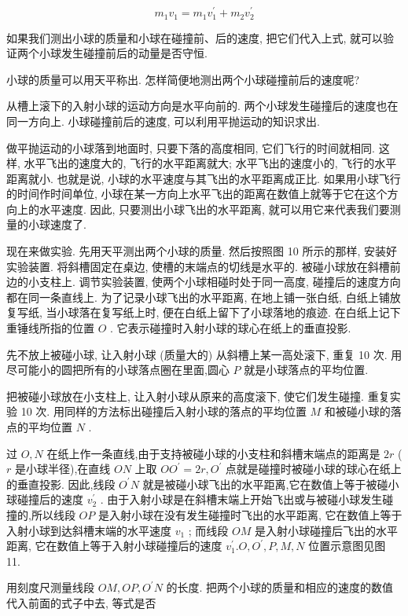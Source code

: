 \documentclass[10pt]{article}
\begin{document}
\[
{m}_{1}{v}_{1} = {m}_{1}{v}_{1}^{\prime } + {m}_{2}{v}_{2}^{\prime }
\]

如果我们测出小球的质量和小球在碰撞前、后的速度, 把它们代入上式, 就可以验证两个小球发生碰撞前后的动量是否守恒.

小球的质量可以用天平称出. 怎样简便地测出两个小球碰撞前后的速度呢?

从槽上滚下的入射小球的运动方向是水平向前的. 两个小球发生碰撞后的速度也在同一方向上. 小球碰撞前后的速度, 可以利用平抛运动的知识求出.

做平抛运动的小球落到地面时, 只要下落的高度相同, 它们飞行的时间就相同. 这样, 水平飞出的速度大的, 飞行的水平距离就大; 水平飞出的速度小的, 飞行的水平距离就小. 也就是说, 小球的水平速度与其飞出的水平距离成正比. 如果用小球飞行的时间作时间单位, 小球在某一方向上水平飞出的距离在数值上就等于它在这个方向上的水平速度. 因此, 只要测出小球飞出的水平距离, 就可以用它来代表我们要测量的小球速度了.

现在来做实验. 先用天平测出两个小球的质量. 然后按照图 10 所示的那样, 安装好实验装置. 将斜槽固定在桌边, 使槽的末端点的切线是水平的. 被碰小球放在斜槽前边的小支柱上. 调节实验装置, 使两个小球相碰时处于同一高度, 碰撞后的速度方向都在同一条直线上. 为了记录小球飞出的水平距离, 在地上铺一张白纸, 白纸上铺放复写纸, 当小球落在复写纸上时, 便在白纸上留下了小球落地的痕迹. 在白纸上记下重锤线所指的位置 \(O\) . 它表示碰撞时入射小球的球心在纸上的垂直投影.

先不放上被碰小球, 让入射小球 (质量大的) 从斜槽上某一高处滚下, 重复 10 次. 用尽可能小的圆把所有的小球落点圈在里面,圆心 \(P\) 就是小球落点的平均位置.

把被碰小球放在小支柱上, 让入射小球从原来的高度滚下, 使它们发生碰撞. 重复实验 10 次. 用同样的方法标出碰撞后入射小球的落点的平均位置 \(M\) 和被碰小球的落点的平均位置 \(N\) .

过 \(O,N\) 在纸上作一条直线,由于支持被碰小球的小支柱和斜槽末端点的距离是 \({2r}\) ( \(r\) 是小球半径),在直线 \({ON}\) 上取 \(O{O}^{\prime } = {2r},{O}^{\prime }\) 点就是碰撞时被碰小球的球心在纸上的垂直投影. 因此,线段 \({O}^{\prime }N\) 就是被碰小球飞出的水平距离,它在数值上等于被碰小球碰撞后的速度 \({v}_{2}^{\prime }\) . 由于入射小球是在斜槽末端上开始飞出或与被碰小球发生碰撞的,所以线段 \({OP}\) 是入射小球在没有发生碰撞时飞出的水平距离, 它在数值上等于入射小球到达斜槽末端的水平速度 \({v}_{1}\) ; 而线段 \({OM}\) 是入射小球碰撞后飞出的水平距离, 它在数值上等于入射小球碰撞后的速度 \({v}_{1}^{\prime }.O,{O}^{\prime },P,M,N\) 位置示意图见图 11.

用刻度尺测量线段 \({OM},{OP},{O}^{\prime }N\) 的长度. 把两个小球的质量和相应的速度的数值代入前面的式子中去, 等式是否
\end{document}
